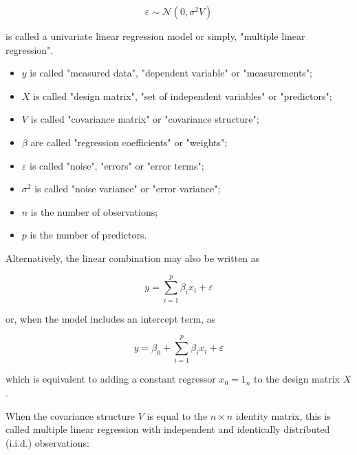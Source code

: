 \documentclass[a4paper,12pt,twoside]{book}
\begin{document}
\begin{equation} \label{eq:mlr-mlr-noise}
\varepsilon \sim \mathcal{N}(0, \sigma^2 V)
\end{equation}

is called a univariate linear regression model or simply, "multiple linear regression".

\begin{itemize}

\item $y$ is called "measured data", "dependent variable" or "measurements";

\item $X$ is called "design matrix", "set of independent variables" or "predictors";

\item $V$ is called "covariance matrix" or "covariance structure";

\item $\beta$ are called "regression coefficients" or "weights";

\item $\varepsilon$ is called "noise", "errors" or "error terms";

\item $\sigma^2$ is called "noise variance" or "error variance";

\item $n$ is the number of observations;

\item $p$ is the number of predictors.

\end{itemize}

Alternatively, the linear combination may also be written as

\begin{equation} \label{eq:mlr-mlr-model-sum}
y = \sum_{i=1}^{p} \beta_i x_i + \varepsilon
\end{equation}

or, when the model includes an intercept term, as

\begin{equation} \label{eq:mlr-mlr-model-sum-base}
y = \beta_0 + \sum_{i=1}^{p} \beta_i x_i + \varepsilon
\end{equation}

which is equivalent to adding a constant regressor $x_0 = 1_n$ to the design matrix $X$.

When the covariance structure $V$ is equal to the $n \times n$ identity matrix, this is called multiple linear regression with independent and identically distributed (i.i.d.) observations:
\end{document}
